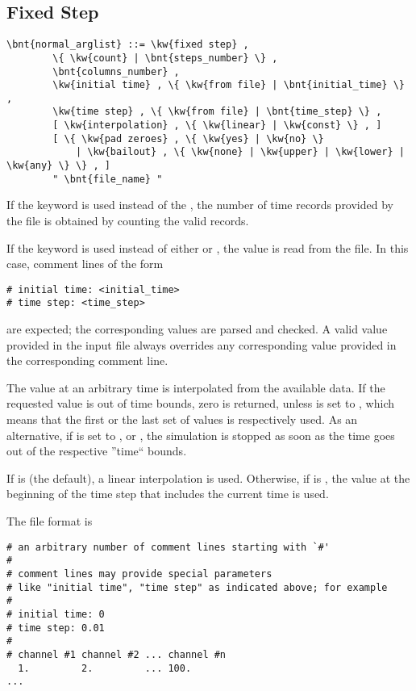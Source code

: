 \subsection{Fixed Step}
\begin{Verbatim}[commandchars=\\\{\}]
    \bnt{normal_arglist} ::= \kw{fixed step} , 
        \{ \kw{count} | \bnt{steps_number} \} ,
        \bnt{columns_number} ,
        \kw{initial time} , \{ \kw{from file} | \bnt{initial_time} \} ,
        \kw{time step} , \{ \kw{from file} | \bnt{time_step} \} ,
        [ \kw{interpolation} , \{ \kw{linear} | \kw{const} \} , ]
        [ \{ \kw{pad zeroes} , \{ \kw{yes} | \kw{no} \}
            | \kw{bailout} , \{ \kw{none} | \kw{upper} | \kw{lower} | \kw{any} \} \} , ]
        " \bnt{file_name} "
\end{Verbatim}
If the keyword  is used instead of the ,
the number of time records provided by the file is obtained
by counting the valid records.

If the keyword  is used instead of either 
 or ,
the value is read from the file.
In this case, comment lines of the form
\begin{verbatim}
# initial time: <initial_time>
# time step: <time_step>
\end{verbatim}
are expected; the corresponding values are parsed and checked.
A valid value provided in the input file always overrides
any corresponding value provided in the corresponding comment line.

The value at an arbitrary time is interpolated from the available data.
If the requested value is out of time bounds, zero is returned,
unless  is set to , which means that the first
or the last set of values is respectively used.
As an alternative, if  is set to , 
or , the simulation is stopped as soon as the time goes out
of the respective ''time`` bounds.

If  is  (the default), a linear interpolation
is used.
Otherwise, if  is , the value at the beginning
of the time step that includes the current time is used.

The file format is
\begin{verbatim}
# an arbitrary number of comment lines starting with `#'
#
# comment lines may provide special parameters
# like "initial time", "time step" as indicated above; for example
#
# initial time: 0
# time step: 0.01
#
# channel #1 channel #2 ... channel #n
  1.         2.         ... 100.
...
\end{verbatim}


